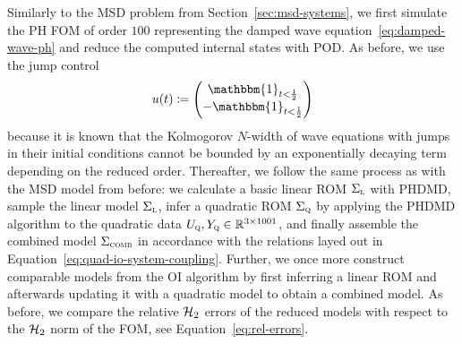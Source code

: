 Similarly to the \ac{MSD} problem from Section~\ref{sec:msd-systems}, we first simulate the \ac{PH} \ac{FOM} of order $100$ representing the damped wave equation~\eqref{eq:damped-wave-ph} and reduce the computed internal states with \ac{POD}.
As before, we use the jump control
\begin{equation*}
    u(t) \coloneqq \begin{pmatrix}
        \mathbbm{1}_{t < \frac{1}{2}} \\
        - \mathbbm{1}_{t < \frac{1}{2}}
    \end{pmatrix}
\end{equation*}
because it is known that the Kolmogorov $N$-width of wave equations with jumps in their initial conditions cannot be bounded by an exponentially decaying term depending on the reduced order.
Thereafter, we follow the same process as with the \ac{MSD} model from before: we calculate a basic linear \ac{ROM} $\Sigma_{\textnormal{\scshape l}}$ with \ac{PHDMD}, sample the linear model $\Sigma_{\textnormal{\scshape l}}$, infer a quadratic \ac{ROM} $\Sigma_{\textnormal{\scshape q}}$ by applying the \ac{PHDMD} algorithm to the quadratic data $U_{\textnormal{\scshape q}}, Y_{\textnormal{\scshape q}} \in \mathbb{R}^{3 \times 1001}$, and finally assemble the combined model $\Sigma_{\textnormal{\scshape comb}}$ in accordance with the relations layed out in Equation~\eqref{eq:quad-io-system-coupling}.
Further, we once more construct comparable models from the \ac{OI} algorithm by first inferring a linear \ac{ROM} and afterwards updating it with a quadratic model to obtain a combined model.
As before, we compare the relative $\mathcal{H}_2$ errors of the reduced models with respect to the $\mathcal{H}_2$ norm of the \ac{FOM}, see Equation~\eqref{eq:rel-errors}.

